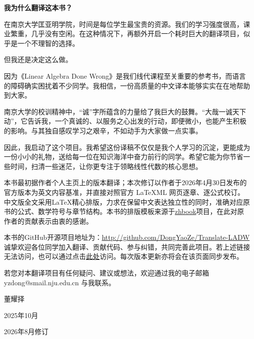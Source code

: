 \begin{preface}[译者的话]

\textbf{我为什么翻译这本书？}

在南京大学匡亚明学院，时间是每位学生最宝贵的资源。我们的学习强度很高，课业繁重，几乎没有空闲。在这种情况下，再额外开启一个耗时巨大的翻译项目，似乎是一个不理智的选择。

但我还是决定这么做。

因为《Linear Algebra Done Wrong》是我们线代课程至关重要的参考书，而语言的障碍确实困扰着不少同学。我相信，一份高质量的中文译本能够实实在在地帮助到大家。

南京大学的校训精神中，“诚”字所蕴含的力量给了我巨大的鼓舞。“大哉一诚天下动”，它告诉我，一个真诚的、以服务之心出发的行动，即便微小，也能产生积极的影响。与其独自感叹学习之艰辛，不如动手为大家做一点实事。

因此，我启动了这个项目。我希望这份译稿不仅仅是我个人学习的沉淀，更能成为一份小小的礼物，送给每一位在知识海洋中奋力前行的同学。希望它能为你节省一些时间，扫清一些迷茫，让你更专注于领略线性代数的核心思想。

\vspace{2ex}

本书最初据作者个人主页上的版本翻译；本次修订以作者于2026年4月30日发布的官方版本为英文内容基准，并直接对照官方 LaTeXML 网页逐章、逐公式校订。中文版全文采用\LaTeX{}精心排版，力求在保留中文表达独立性的同时，准确对应原书的公式、数学符号与章节结构。本书的排版模板来源于\href{http://haixing-hu.github.io/xelatex-zh-book/}{zhbook}项目，在此对原作者的贡献表示由衷的感谢。

本书的GitHub开源项目地址为：\url{http://github.com/DongYaoZe/Translate-LADW}
诚挚欢迎各位同学加入翻译、贡献代码、参与纠错，共同完善此项目。若上述链接无法访问，也可以通过点击\href{https://box.nju.edu.cn/d/a137a21fa716469c89da/}{此处}访问。每次版本更新亦将会在该页面同步发布。

若您对本翻译项目有任何疑问、建议或想法，欢迎通过我的电子邮箱
\\
yzdong@smail.nju.edu.cn 与我联系。

\vspace{5ex}
\begin{flushright}
董耀择~~~~~~~~~

2025年10月~~~~~

2026年8月修订~~~~~
\end{flushright}

\end{preface}

